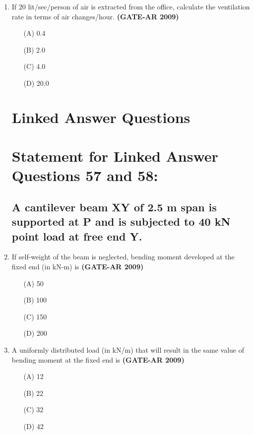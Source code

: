\documentclass[a4paper,10pt]{article}
\begin{document}
\begin{enumerate}
    \item If 20 lit/sec/person of air is extracted from the office, calculate the ventilation rate in terms of air changes/hour. \hfill \textbf{(GATE-AR 2009)}
    \begin{multicols}{4}
	\begin{itemize}
        \item[(A)] 0.4
        \item[(B)] 2.0
        \item[(C)] 4.0
        \item[(D)] 20.0
    \end{itemize}
	\end{multicols}

\section*{Linked Answer Questions}

\section*{Statement for Linked Answer Questions 57 and 58:}
\subsection*{A cantilever beam XY of 2.5 m span is supported at P and is subjected to 40 kN point load at free end Y.}

    \item If self-weight of the beam is neglected, bending moment developed at the fixed end (in kN-m) is \hfill \textbf{(GATE-AR 2009)}
    \begin{multicols}{4}
	\begin{itemize}
        \item[(A)] 50
        \item[(B)] 100
        \item[(C)] 150
        \item[(D)] 200
    \end{itemize}
	\end{multicols}

    \item A uniformly distributed load (in kN/m) that will result in the same value of bending moment at the fixed end is \hfill \textbf{(GATE-AR 2009)}
    \begin{multicols}{4}
	\begin{itemize}
        \item[(A)] 12
        \item[(B)] 22
        \item[(C)] 32
        \item[(D)] 42
    \end{itemize}
	\end{multicols}


\end{enumerate}
\end{document}
